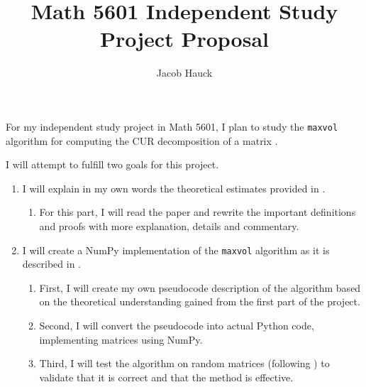 \documentclass{article}
\title{Math 5601 Independent Study Project Proposal}
\author{Jacob Hauck}
\begin{document}
	\maketitle
	
	For my independent study project in Math 5601, I plan to study the \verb*|maxvol| algorithm for computing the CUR decomposition of a matrix \cite{goreinov_2010}.
	
	I will attempt to fulfill two goals for this project.
	\begin{enumerate}
		\item I will explain in my own words the theoretical estimates provided in \cite{goreinov_2010}.
		\begin{enumerate}
			\item For this part, I will read the paper and rewrite the important definitions and proofs with more explanation, details and commentary.
		\end{enumerate}
		\item I will create a NumPy implementation of the \verb*|maxvol| algorithm as it is described in \cite{goreinov_2010}.
		\begin{enumerate}
			\item First, I will create my own pseudocode description of the algorithm based on the theoretical understanding gained from the first part of the project.
			\item Second, I will convert the pseudocode into actual Python code, implementing matrices using NumPy.
			\item Third, I will test the algorithm on random matrices (following \cite{goreinov_2010}) to validate that it is correct and that the method is effective.
		\end{enumerate}
	\end{enumerate}
	
	
	
\end{document}
